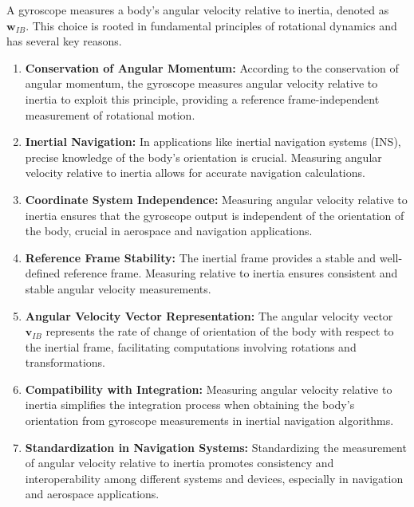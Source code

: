A gyroscope measures a body's angular velocity relative to inertia, denoted as \( \mathbf{w}_{IB} \). This choice is rooted in fundamental principles of rotational dynamics and has several key reasons.

\begin{enumerate}
  \item \textbf{Conservation of Angular Momentum:}
    According to the conservation of angular momentum, the gyroscope measures angular velocity relative to inertia to exploit this principle, providing a reference frame-independent measurement of rotational motion.

  \item \textbf{Inertial Navigation:}
    In applications like inertial navigation systems (INS), precise knowledge of the body's orientation is crucial. Measuring angular velocity relative to inertia allows for accurate navigation calculations.

  \item \textbf{Coordinate System Independence:}
    Measuring angular velocity relative to inertia ensures that the gyroscope output is independent of the orientation of the body, crucial in aerospace and navigation applications.

  \item \textbf{Reference Frame Stability:}
    The inertial frame provides a stable and well-defined reference frame. Measuring relative to inertia ensures consistent and stable angular velocity measurements.

  \item \textbf{Angular Velocity Vector Representation:}
    The angular velocity vector \( \mathbf{v}_{IB} \) represents the rate of change of orientation of the body with respect to the inertial frame, facilitating computations involving rotations and transformations.

  \item \textbf{Compatibility with Integration:}
    Measuring angular velocity relative to inertia simplifies the integration process when obtaining the body's orientation from gyroscope measurements in inertial navigation algorithms.

  \item \textbf{Standardization in Navigation Systems:}
    Standardizing the measurement of angular velocity relative to inertia promotes consistency and interoperability among different systems and devices, especially in navigation and aerospace applications.
\end{enumerate}


